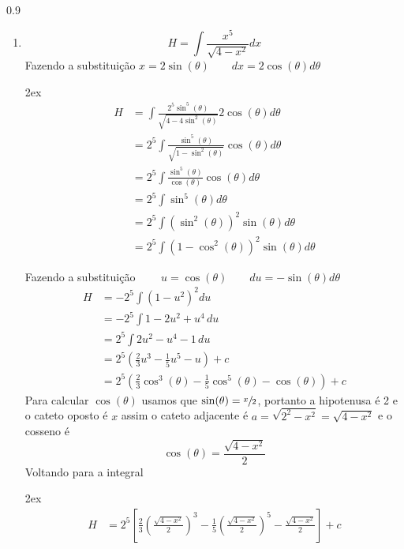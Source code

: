 \documentclass[a4paper,12pt,fleqn]{article}
\newenvironment{resposta}%
{\begingroup\color{blue}\small\begin{spacing}{0.9}}%
  {\end{spacing}\endgroup}
\begin{document}
\begin{resposta}
\begin{enumerate}[label=\alph*)]
    \item
    \[
    H = \int \frac{x^5}{\sqrt{4-x^2}} dx
    \]
    Fazendo a substituição
    \(
    x = 2\sin(\theta)
    \qquad
    dx = 2\cos(\theta) d\theta
    \)
    \begin{spreadlines}{2ex}
      \begin{align*}
        H
        & = \int \frac{2^5 \sin^5(\theta)}{\sqrt{4-4\sin^2(\theta)}} 2\cos(\theta) d\theta \\
        & = 2^5 \int \frac{\sin^5(\theta)}{\sqrt{1-\sin^2(\theta)}} \cos(\theta) d\theta \\
        & = 2^5 \int \frac{\sin^5(\theta)}{\cos(\theta)} \cos(\theta) d\theta \\
        & = 2^5 \int \sin^5(\theta) d\theta \\
        & = 2^5 \int \left(\sin^2(\theta)\right)^2 \sin(\theta) d\theta \\
        & = 2^5 \int \left(1-\cos^2(\theta)\right)^2 \sin(\theta) d\theta
      \end{align*}
    \end{spreadlines}
    Fazendo a substituição
    \(
    \qquad
    u = \cos(\theta)
    \qquad
    du = -\sin(\theta)d\theta
    \)
    \begin{align*}
      H
      & = -2^5 \int \left(1-u^2\right)^2 du \\
      & = -2^5 \int 1-2u^2 + u^4\, du \\
      & = 2^5 \int 2u^2 - u^4 -1\, du \\
      & = 2^5 \left(\frac{2}{3}u^3 - \frac{1}{5}u^5 - u \right) + c \\
      & = 2^5 \left(\frac{2}{3}\cos^3(\theta)
      - \frac{1}{5}\cos^5(\theta)
      - \cos(\theta) \right) + c
    \end{align*}
    Para calcular \(\cos(\theta)\) usamos que \(\sin(\theta) = \sfrac{x}{2}\), portanto
    a hipotenusa é 2 e o cateto oposto é $x$ assim o cateto adjacente é
    \(
    a = \sqrt{2^2-x^2} = \sqrt{4-x^2}
    \)
    e o cosseno é
    \[
    \cos(\theta) = \frac{\sqrt{4-x^2}}{2}
    \]
    Voltando para a integral
    \begin{spreadlines}{2ex}
      \begin{align*}
        H
        & = 2^5\left[
        \frac{2}{3}\left(\frac{\sqrt{4-x^2}}{2}\right)^3
        - \frac{1}{5}\left(\frac{\sqrt{4-x^2}}{2}\right)^5
        - \frac{\sqrt{4-x^2}}{2}
        \right] + c \\

\end{align*}
\end{spreadlines}
\end{enumerate}
\end{resposta}
\end{document}
